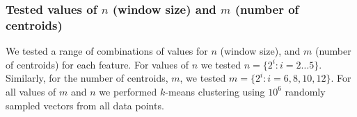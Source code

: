 \subsubsection{Tested values of $n$ (window size) and $m$ (number of centroids)}

We tested a range of combinations of values for $n$ (window size), and $m$ (number of centroids) for each feature.  For values of $n$ we tested $n=\{2^{i}:i=2\dots 5\}$.  Similarly, for the number of centroids, $m$, we tested $m=\{2^{i}:i=6,8,10,12\}$. For all values of $m$ and $n$ we performed $k$-means clustering using $10^6$ randomly sampled vectors from all data points.


